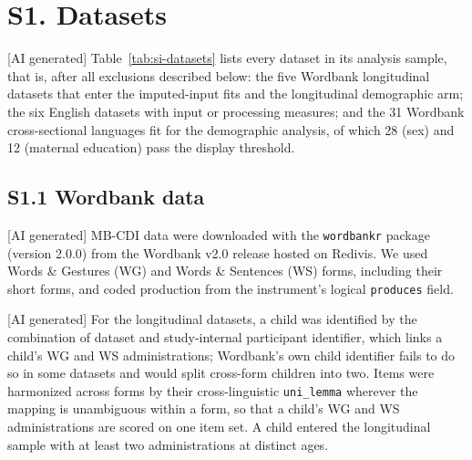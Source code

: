 
\section*{S1. Datasets}

[AI generated] Table~\ref{tab:si-datasets} lists every dataset in its analysis
sample, that is, after all exclusions described below: the five Wordbank
longitudinal datasets that enter the imputed-input fits and the longitudinal
demographic arm; the six English datasets with input or processing measures; and
the 31 Wordbank cross-sectional languages fit for the demographic analysis, of
which 28 (sex) and 12 (maternal education) pass the display threshold.

\begin{table}[htbp]
\centering\footnotesize
\caption{[AI generated] Datasets and analysis samples. Children and administrations
are counts after exclusions; ages are administration ages in months; recordings are
day-long LENA recordings or BabyView videos entering the input measurement model;
LWL sessions are looking-while-listening administrations entering the processing
measurement model. Regenerated from the fitted bundles by
\texttt{paper/tables/datasets\_table.R}.}
\label{tab:si-datasets}

\end{table}

\subsection*{S1.1 Wordbank data}

[AI generated] MB-CDI data were downloaded with the \texttt{wordbankr} package
(version 2.0.0) from the Wordbank v2.0 release hosted on Redivis. We used Words \&
Gestures (WG) and Words \& Sentences (WS) forms, including their short forms, and
coded production from the instrument's logical \texttt{produces} field.

[AI generated] For the longitudinal datasets, a child was identified by the
combination of dataset and study-internal participant identifier, which links a
child's WG and WS administrations; Wordbank's own child identifier fails to do so
in some datasets and would split cross-form children into two. Items were
harmonized across forms by their cross-linguistic \texttt{uni\_lemma} wherever the
mapping is unambiguous within a form, so that a child's WG and WS administrations
are scored on one item set. A child entered the longitudinal sample with at least
two administrations at distinct ages.

